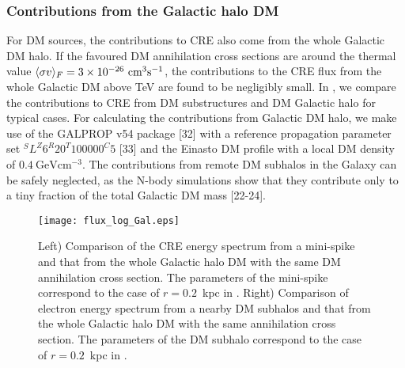 \subsubsection{Contributions from the Galactic halo DM}
For DM sources, the contributions to CRE also come from the whole Galactic DM halo.
If the favoured  DM annihilation cross sections are around the thermal value
$\langle \sigma v \rangle_{F}=3\times 10^{-26}~\text{cm}^{3}\text{s}^{-1}$,
the contributions to the CRE flux  from the whole Galactic DM above TeV
are found  to be  negligibly small. 
In , we compare the contributions
to CRE from DM substructures and DM Galactic halo for typical cases.
For calculating the contributions from Galactic DM halo,
we make use of the GALPROP v54 package [32] %
with a reference propagation parameter set
$^SL^Z6^R20^T100000^C5$ [33] %
and the Einasto DM profile with a local DM density of 
$0.4~\text{GeV}\text{cm}^{-3}$.
The contributions from remote DM subhalos in the Galaxy can be safely  neglected, 
as the N-body simulations show that they contribute only to a tiny  fraction of 
the total Galactic DM mass [22-24]. %
\begin{figure}[!htb]
	\centering
	\texttt{[image: flux\_log\_Gal.eps]}
	\caption{
	Left)
	Comparison of the CRE energy spectrum from a mini-spike and that from the whole Galactic halo DM
	with the same DM annihilation cross section. 
	The parameters of the mini-spike correspond to the case of $r=0.2$~kpc in .
	Right)
	Comparison of  electron energy spectrum from a nearby DM subhalos 
	and that from the whole Galactic halo DM with the same annihilation cross section. 
	The parameters of the DM subhalo correspond to the case of $r=0.2$~kpc in .
	}
	\label{fig:DM-Galactic-halo}
\end{figure}



